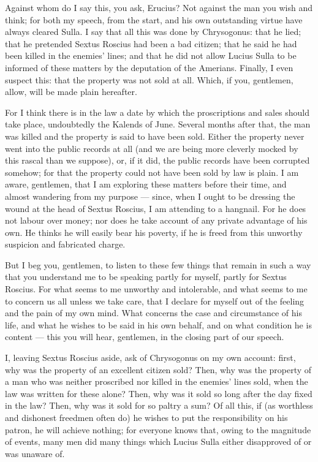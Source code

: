  Against whom do I say this, you ask, Erucius? Not against the man you wish and think; for both my speech, from the start, and his own outstanding virtue have always cleared Sulla. I say that all this was done by Chrysogonus: that he lied; that he pretended Sextus Roscius had been a bad citizen; that he said he had been killed in the enemies' lines; and that he did not allow Lucius Sulla to be informed of these matters by the deputation of the Amerians. Finally, I even suspect this: that the property was not sold at all. Which, if you, gentlemen, allow, will be made plain hereafter.

 For I think there is in the law a date by which the proscriptions and sales should take place, undoubtedly the Kalends of June. Several months after that, the man was killed and the property is said to have been sold. Either the property never went into the public records at all (and we are being more cleverly mocked by this rascal than we suppose), or, if it did, the public records have been corrupted somehow; for that the property could not have been sold by law is plain. I am aware, gentlemen, that I am exploring these matters before their time, and almost wandering from my purpose --- since, when I ought to be dressing the wound at the head of Sextus Roscius, I am attending to a hangnail. For he does not labour over money; nor does he take account of any private advantage of his own. He thinks he will easily bear his poverty, if he is freed from this unworthy suspicion and fabricated charge.

 But I beg you, gentlemen, to listen to these few things that remain in such a way that you understand me to be speaking partly for myself, partly for Sextus Roscius. For what seems to me unworthy and intolerable, and what seems to me to concern us all unless we take care, that I declare for myself out of the feeling and the pain of my own mind. What concerns the case and circumstance of his life, and what he wishes to be said in his own behalf, and on what condition he is content --- this you will hear, gentlemen, in the closing part of our speech.

 I, leaving Sextus Roscius aside, ask of Chrysogonus on my own account: first, why was the property of an excellent citizen sold? Then, why was the property of a man who was neither proscribed nor killed in the enemies' lines sold, when the law was written for these alone? Then, why was it sold so long after the day fixed in the law? Then, why was it sold for so paltry a sum? Of all this, if (as worthless and dishonest freedmen often do) he wishes to put the responsibility on his patron, he will achieve nothing; for everyone knows that, owing to the magnitude of events, many men did many things which Lucius Sulla either disapproved of or was unaware of.

